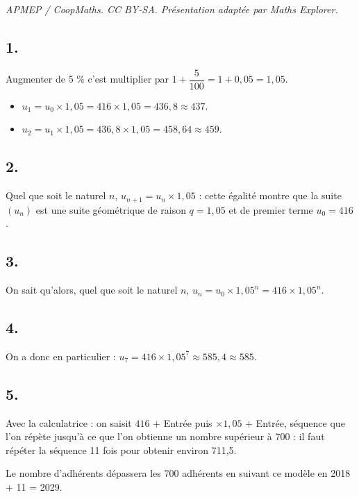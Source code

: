 \documentclass[10pt]{article}
\begin{document}
\noindent\textit{APMEP / CoopMaths. CC BY-SA. Présentation adaptée par Maths Explorer.}\par\medskip
\subsection*{1.}

Augmenter de 5 \% c'est multiplier par \(1 + \dfrac{5}{100} = 1 + 0{,}05 = 1{,}05\).

\begin{itemize}
    \item \(u_1 = u_0 \times 1{,}05 = 416 \times 1{,}05 = 436{,}8 \approx 437\).
    \item \(u_2 = u_1 \times 1{,}05 = 436{,}8 \times 1{,}05 = 458{,}64 \approx 459\).
\end{itemize}

\subsection*{2.}

Quel que soit le naturel \(n\), \(u_{n+1} = u_n \times 1{,}05\) : cette égalité montre que la suite \((u_n)\) est une suite géométrique de raison \(q = 1{,}05\) et de premier terme \(u_0 = 416\).

\subsection*{3.}

On sait qu'alors, quel que soit le naturel \(n\), \(u_n = u_0 \times 1{,}05^n = 416 \times 1{,}05^n\).

\subsection*{4.}

On a donc en particulier : \(u_7 = 416 \times 1{,}05^7 \approx 585{,}4 \approx 585\).

\subsection*{5.}

Avec la calculatrice : on saisit \(416\) + Entrée puis \(\times 1{,}05\) + Entrée, séquence que l'on répète jusqu'à ce que l'on obtienne un nombre supérieur à 700 : il faut répéter la séquence 11 fois pour obtenir environ 711{,}5.

Le nombre d'adhérents dépassera les 700 adhérents en suivant ce modèle en 2018 + 11 = 2029.
\end{document}
